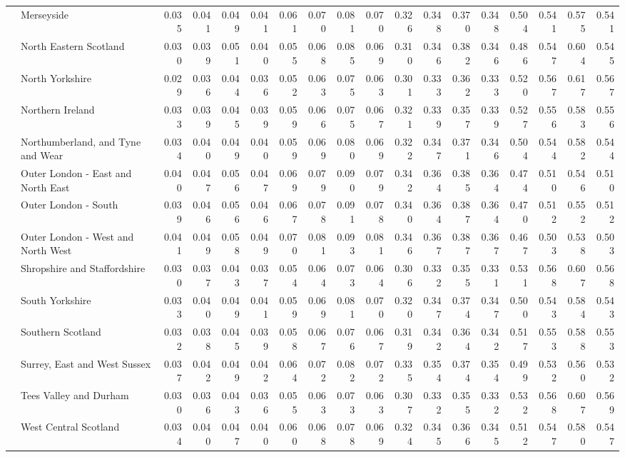 \begin{tabular}{llrrrrrrrrrrrrrrrr}
 & Merseyside & 0.035 & 0.041 & 0.049 & 0.041 & 0.061 & 0.070 & 0.081 & 0.070 & 0.326 & 0.348 & 0.370 & 0.348 & 0.504 & 0.541 & 0.575 & 0.541 \\
 & North Eastern Scotland & 0.030 & 0.039 & 0.051 & 0.040 & 0.055 & 0.068 & 0.085 & 0.069 & 0.310 & 0.346 & 0.382 & 0.346 & 0.486 & 0.547 & 0.604 & 0.545 \\
 & North Yorkshire & 0.029 & 0.036 & 0.044 & 0.036 & 0.052 & 0.063 & 0.075 & 0.063 & 0.301 & 0.333 & 0.362 & 0.333 & 0.520 & 0.567 & 0.617 & 0.567 \\
 & Northern Ireland & 0.033 & 0.039 & 0.045 & 0.039 & 0.059 & 0.066 & 0.075 & 0.067 & 0.321 & 0.339 & 0.357 & 0.339 & 0.527 & 0.556 & 0.583 & 0.556 \\
 & Northumberland, and Tyne and Wear & 0.034 & 0.040 & 0.049 & 0.040 & 0.059 & 0.069 & 0.080 & 0.069 & 0.322 & 0.347 & 0.371 & 0.346 & 0.504 & 0.544 & 0.582 & 0.544 \\
 & Outer London - East and North East & 0.040 & 0.047 & 0.056 & 0.047 & 0.069 & 0.079 & 0.090 & 0.079 & 0.342 & 0.364 & 0.385 & 0.364 & 0.474 & 0.510 & 0.546 & 0.510 \\
 & Outer London - South & 0.039 & 0.046 & 0.056 & 0.046 & 0.067 & 0.078 & 0.091 & 0.078 & 0.340 & 0.364 & 0.387 & 0.364 & 0.470 & 0.512 & 0.552 & 0.512 \\
 & Outer London - West and North West & 0.041 & 0.049 & 0.058 & 0.049 & 0.070 & 0.081 & 0.093 & 0.081 & 0.346 & 0.367 & 0.387 & 0.367 & 0.467 & 0.503 & 0.538 & 0.503 \\
 & Shropshire and Staffordshire & 0.030 & 0.037 & 0.043 & 0.037 & 0.054 & 0.064 & 0.073 & 0.064 & 0.306 & 0.332 & 0.355 & 0.331 & 0.531 & 0.568 & 0.607 & 0.568 \\
 & South Yorkshire & 0.033 & 0.040 & 0.049 & 0.041 & 0.059 & 0.069 & 0.081 & 0.070 & 0.320 & 0.347 & 0.374 & 0.347 & 0.500 & 0.543 & 0.584 & 0.543 \\
 & Southern Scotland & 0.032 & 0.038 & 0.045 & 0.039 & 0.058 & 0.067 & 0.076 & 0.067 & 0.319 & 0.342 & 0.364 & 0.342 & 0.517 & 0.553 & 0.588 & 0.553 \\
 & Surrey, East and West Sussex & 0.037 & 0.042 & 0.049 & 0.042 & 0.064 & 0.072 & 0.082 & 0.072 & 0.335 & 0.354 & 0.374 & 0.354 & 0.499 & 0.532 & 0.560 & 0.532 \\
 & Tees Valley and Durham & 0.030 & 0.036 & 0.043 & 0.036 & 0.055 & 0.063 & 0.073 & 0.063 & 0.307 & 0.332 & 0.355 & 0.332 & 0.532 & 0.568 & 0.607 & 0.569 \\
 & West Central Scotland & 0.034 & 0.040 & 0.047 & 0.040 & 0.060 & 0.068 & 0.078 & 0.069 & 0.324 & 0.345 & 0.366 & 0.345 & 0.512 & 0.547 & 0.580 & 0.547 \\

\end{tabular}
